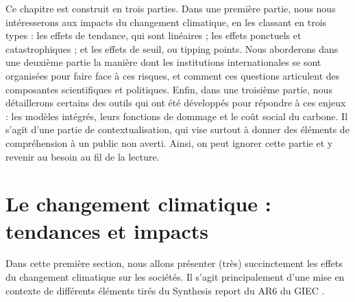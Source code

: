 Ce chapitre est construit en trois parties. Dans une première partie, nous nous intéresserons aux impacts du changement climatique, en les classant en trois types : les effets de tendance, qui sont linéaires ; les effets ponctuels et catastrophiques ; et les effets de seuil, ou tipping points. Nous aborderons dans une deuxième partie la manière dont les institutions internationales se sont organisées pour faire face à ces risques, et comment ces questions articulent des composantes scientifiques et politiques. Enfin, dans une troisième partie, nous détaillerons certains des outils qui ont été développés pour répondre à ces enjeux : les modèles intégrés, leurs fonctions de dommage et le coût social du carbone. Il s'agit d'une partie de contextualisation, qui vise surtout à donner des éléments de compréhension à un public non averti. Ainsi, on peut ignorer cette partie et y revenir au besoin au fil de la lecture. 




\section{Le changement climatique : tendances et impacts}
\label{sect/1/1}

Dans cette première section, nous allons présenter (très) succinctement les effets du changement climatique sur les sociétés. Il s'agit principalement d'une mise en contexte de différents éléments tirés du Synthesis report du \Gls{AR6} du \Gls{GIEC} \autocite{lee_ipcc_2023}. \\

